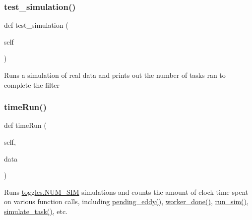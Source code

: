 \subsubsection{\texorpdfstring{test\_simulation()}{test\_simulation()}}
{\footnotesize\ttfamily def test\+\_\+simulation (\begin{DoxyParamCaption}\item[{}]{self }\end{DoxyParamCaption})}

\begin{DoxyVerb}Runs a simulation of real data and prints out the number of tasks
ran to complete the filter
\end{DoxyVerb}
 \mbox{\label{classdynamicfilterapp_1_1test__simulations_1_1_simulation_test_a6977d93287474dfe398931c8c0b381c3}} 
\subsubsection{\texorpdfstring{timeRun()}{timeRun()}}
{\footnotesize\ttfamily def time\+Run (\begin{DoxyParamCaption}\item[{}]{self,  }\item[{}]{data }\end{DoxyParamCaption})}



Runs \mbox{\hyperlink{namespacedynamicfilterapp_1_1toggles_a3baf5565851cd87736238d8dddfc1106}{toggles.\+N\+U\+M\+\_\+\+S\+IM}} simulations and counts the amount of clock time spent on various function calls, including \mbox{\hyperlink{namespacedynamicfilterapp_1_1views__helpers_ad11bcb9737901ab723493b4f7fe09329}{pending\+\_\+eddy()}}, \mbox{\hyperlink{namespacedynamicfilterapp_1_1views__helpers_af27860dfe5bfa6b2b8a1b29347eb918d}{worker\+\_\+done()}}, \mbox{\hyperlink{classdynamicfilterapp_1_1test__simulations_1_1_simulation_test_aafbc405f49645141a30302a448b056dc}{run\+\_\+sim()}}, \mbox{\hyperlink{classdynamicfilterapp_1_1test__simulations_1_1_simulation_test_a8bed8f0f57234f8356ce3bc19606c6bf}{simulate\+\_\+task()}}, etc. 

